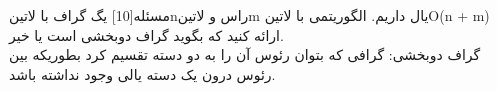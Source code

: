 
‌مسئله[10]
یگ گراف با ‌لاتین{n}‌راس و ‌لاتین{m} یال داریم. الگوریتمی با ‌لاتین{O(n + m)} ارائه کنید که بگوید گراف دوبخشی است یا خیر. 
\\ گراف دوبخشی:‌ گرافی که بتوان رئوس آن را به دو دسته تقسیم کرد بطوریکه بین رئوس درون یک دسته یالی وجود نداشته باشد.












